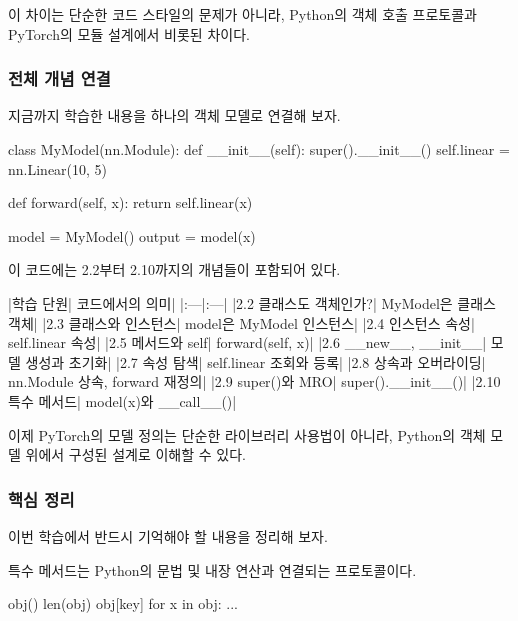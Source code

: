 이 차이는 단순한 코드 스타일의 문제가 아니라, Python의 객체 호출 프로토콜과 PyTorch의 모듈 설계에서 비롯된 차이다.

\subsubsection{전체 개념 연결}

지금까지 학습한 내용을 하나의 객체 모델로 연결해 보자.

\begin{dhkcode}
class MyModel(nn.Module):
    def __init__(self):
        super().__init__()
        self.linear = nn.Linear(10, 5)

    def forward(self, x):
        return self.linear(x)


model = MyModel()
output = model(x)
\end{dhkcode}

이 코드에는 2.2부터 2.10까지의 개념들이 포함되어 있다.

\begin{dhktable}
|학습 단원|	코드에서의 의미|
|:---|:---|
|2.2 클래스도 객체인가?|	MyModel은 클래스 객체|
|2.3 클래스와 인스턴스|	model은 MyModel 인스턴스|
|2.4 인스턴스 속성|	self.linear 속성|
|2.5 메서드와 self|	forward(self, x)|
|2.6 __new__, __init__|	모델 생성과 초기화|
|2.7 속성 탐색|	self.linear 조회와 등록|
|2.8 상속과 오버라이딩|	nn.Module 상속, forward 재정의|
|2.9 super()와 MRO|	super().__init__()|
|2.10 특수 메서드|	model(x)와 __call__()|
\end{dhktable}

이제 PyTorch의 모델 정의는 단순한 라이브러리 사용법이 아니라, Python의 객체 모델 위에서 구성된 설계로 이해할 수 있다.

\subsubsection{핵심 정리}

이번 학습에서 반드시 기억해야 할 내용을 정리해 보자.

\begin{dhknote}
\begin{dhksmry}[centered]
특수 메서드는 
Python의 문법 및 내장 연산과 연결되는 프로토콜이다.
\end{dhksmry}
\end{dhknote}

\begin{dhkcode}
obj()
len(obj)
obj[key]
for x in obj:
    ...
\end{dhkcode}

